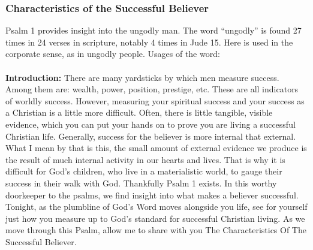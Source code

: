\subsubsection{Characteristics of the Successful Believer}
Psalm 1 provides insight into the ungodly man. The word ``ungodly'' is found 27 times in 24 verses in scripture, notably 4 times in Jude 15. Here is used in the corporate sense, as in ungodly people. Usages of the word: \\ \\
\noindent \textbf{Introduction: }There are many yardsticks by which men measure success. Among them are: wealth, power, position, prestige, etc. These are all indicators of worldly success. However, measuring your spiritual success and your success as a Christian is a little more difficult. Often, there is little tangible, visible evidence, which you can put your hands on to prove you are living a successful Christian life. Generally, success for the believer is more internal that external. What I mean by that is this, the small amount of external evidence we produce is the result of much internal activity in our hearts and lives. That is why it is difficult for God’s children, who live in a materialistic world, to gauge their success in their walk with God. Thankfully Psalm 1 exists. In this worthy doorkeeper to the psalms, we find insight into what makes a believer successful. Tonight, as the plumbline of God’s Word moves alongside you life, see for yourself just how you measure up to God’s standard for successful Christian living. As we move through this Psalm, allow me to share with you The Characteristics Of The Successful Believer.

